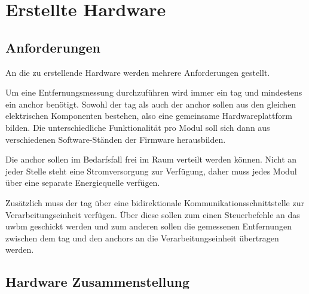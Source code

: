 \begin{comment}
------------------------------------------------------------------------------------------
\end{comment}
\section{Erstellte Hardware}

\begin{comment}
------------------------------------------------------------------------------------------
- Datenübertragung zum Host
- Batteriebetrieb
- TODO: Erweiterbare Hardwareplattform
\end{comment}
\subsection{Anforderungen}

An die zu erstellende Hardware werden mehrere Anforderungen gestellt.

Um eine Entfernungsmessung durchzuführen wird immer ein \Gls{tag} und mindestens ein \Gls{anchor} benötigt. Sowohl der \Gls{tag} als auch der \Gls{anchor} sollen aus den gleichen elektrischen Komponenten bestehen, also eine gemeinsame Hardwareplattform bilden. Die unterschiedliche Funktionalität pro Modul soll sich dann aus verschiedenen Software-Ständen der Firmware herausbilden.

Die \Gls{anchor} sollen im Bedarfsfall frei im Raum verteilt werden können. Nicht an jeder Stelle steht eine Stromversorgung zur Verfügung, daher muss jedes Modul über eine separate Energiequelle verfügen.

Zusätzlich muss der \Gls{tag} über eine bidirektionale Kommunikationsschnittstelle zur Verarbeitungseinheit verfügen. Über diese sollen zum einen Steuerbefehle an das \Gls{uwbm} geschickt werden und zum anderen sollen die gemessenen Entfernungen zwischen dem \Gls{tag} und den \Glspl{anchor} an die Verarbeitungseinheit übertragen werden.


\begin{comment}
------------------------------------------------------------------------------------------
- Zusätzlich werden Erfahrungsberichte aus dem Internet ausgewertet um die Beschaltung weiter zu verfeinern, siehe \cite{Trojer2015, Holder2016, Holder2016a}.
\end{comment}
\subsection{Hardware Zusammenstellung}



